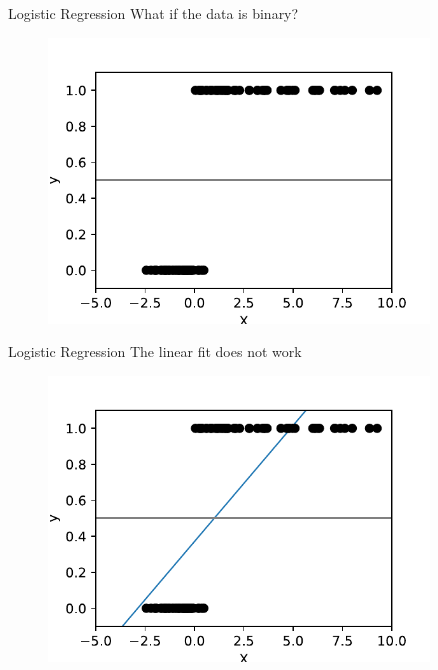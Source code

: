 \documentclass[10pt]{beamer}
\begin{document}
\begin{frame}{Logistic Regression}
What if the data is binary?
	\begin{figure}	
		\includegraphics[width=0.9\textwidth, center, trim=0cm 0cm 0 0cm]{images/logit_data.pdf}
	\end{figure}
\end{frame}

\begin{frame}{Logistic Regression}
The linear fit does not work
	\begin{figure}	
		\includegraphics[width=0.9\textwidth, center, trim=0cm 0cm 0 0cm]{images/logit_line_data.pdf}
	\end{figure}
\end{frame}
\end{document}
